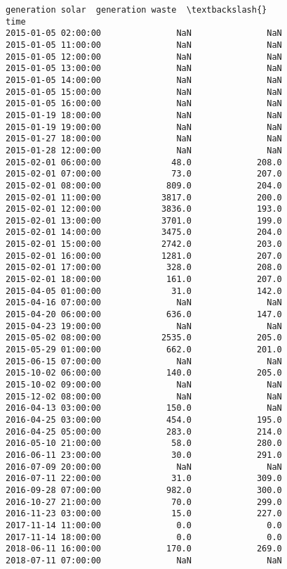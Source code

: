 \documentclass[11pt]{article}
\begin{document}
\begin{tcolorbox}[breakable, size=fbox, boxrule=.5pt, pad at break*=1mm, opacityfill=0]
\begin{Verbatim}[commandchars=\\\{\}]
                     generation solar  generation waste  \textbackslash{}
time
2015-01-05 02:00:00               NaN               NaN
2015-01-05 11:00:00               NaN               NaN
2015-01-05 12:00:00               NaN               NaN
2015-01-05 13:00:00               NaN               NaN
2015-01-05 14:00:00               NaN               NaN
2015-01-05 15:00:00               NaN               NaN
2015-01-05 16:00:00               NaN               NaN
2015-01-19 18:00:00               NaN               NaN
2015-01-19 19:00:00               NaN               NaN
2015-01-27 18:00:00               NaN               NaN
2015-01-28 12:00:00               NaN               NaN
2015-02-01 06:00:00              48.0             208.0
2015-02-01 07:00:00              73.0             207.0
2015-02-01 08:00:00             809.0             204.0
2015-02-01 11:00:00            3817.0             200.0
2015-02-01 12:00:00            3836.0             193.0
2015-02-01 13:00:00            3701.0             199.0
2015-02-01 14:00:00            3475.0             204.0
2015-02-01 15:00:00            2742.0             203.0
2015-02-01 16:00:00            1281.0             207.0
2015-02-01 17:00:00             328.0             208.0
2015-02-01 18:00:00             161.0             207.0
2015-04-05 01:00:00              31.0             142.0
2015-04-16 07:00:00               NaN               NaN
2015-04-20 06:00:00             636.0             147.0
2015-04-23 19:00:00               NaN               NaN
2015-05-02 08:00:00            2535.0             205.0
2015-05-29 01:00:00             662.0             201.0
2015-06-15 07:00:00               NaN               NaN
2015-10-02 06:00:00             140.0             205.0
2015-10-02 09:00:00               NaN               NaN
2015-12-02 08:00:00               NaN               NaN
2016-04-13 03:00:00             150.0               NaN
2016-04-25 03:00:00             454.0             195.0
2016-04-25 05:00:00             283.0             214.0
2016-05-10 21:00:00              58.0             280.0
2016-06-11 23:00:00              30.0             291.0
2016-07-09 20:00:00               NaN               NaN
2016-07-11 22:00:00              31.0             309.0
2016-09-28 07:00:00             982.0             300.0
2016-10-27 21:00:00              70.0             299.0
2016-11-23 03:00:00              15.0             227.0
2017-11-14 11:00:00               0.0               0.0
2017-11-14 18:00:00               0.0               0.0
2018-06-11 16:00:00             170.0             269.0
2018-07-11 07:00:00               NaN               NaN


\end{Verbatim}
\end{tcolorbox}
\end{document}
